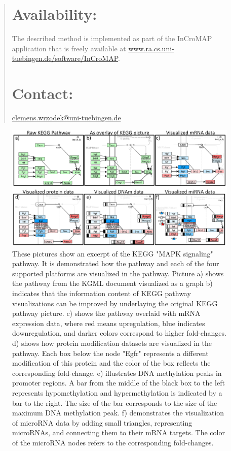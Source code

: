 \documentclass{bioinfo}
\begin{document}
\begin{abstract}
\section{Availability:}
The described method is implemented as part of the InCroMAP application that is freely available at \href{http://www.ra.cs.uni-tuebingen.de/software/InCroMAP/}{www.ra.cs.uni-tuebingen.de/software/InCroMAP}.

\section{Contact:} \href{mailto:clemens.wrzodek@uni-tuebingen.de}{clemens.wrzodek@uni-tuebingen.de}
\end{abstract}


\begin{figure}[t]
\centering
\includegraphics[width=1.0\textwidth]{figures/visualization-steps.png}
\caption{These pictures show an excerpt of the KEGG "MAPK signaling" pathway. It is demonstrated how the
pathway and each of the four supported platforms are visualized in the pathway. Picture a) shows the
pathway from the KGML document visualized as a graph b) indicates that the information content of KEGG
pathway visualizations can be improved by underlaying the original KEGG pathway picture. c) shows the
pathway overlaid with mRNA expression data, where red means upregulation, blue indicates downregulation, and
darker colors correspond to higher fold-changes. d) shows how protein modification datasets are
visualized in the pathway. Each box below the node "Egfr" represents a different modification of this
protein and the color of the box reflects the corresponding fold-change. e) illustrates DNA
methylation peaks in promoter regions. A bar from the middle of the black box to the left represents
hypomethylation and hypermethylation is indicated by a bar to the right. The size of the bar
corresponds to the size of the maximum DNA methylation peak. f) demonstrates the visualization of
microRNA data by adding small triangles, representing microRNAs, and connecting them to their mRNA targets.
The color of the microRNA nodes refers to the corresponding fold-changes.}
\label{fig:visualization_steps}
\end{figure}
\end{document}
